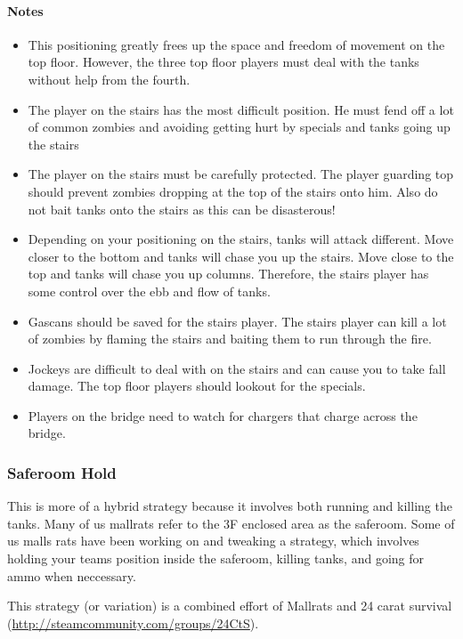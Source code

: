 \paragraph{Notes}
\begin{itemize}
\item This positioning greatly frees up the space and freedom of movement on the top floor. However, the three top floor players must deal with the tanks without help from the fourth.
\item The player on the stairs has the most difficult position. He must fend off a lot of common zombies and avoiding getting hurt by specials and tanks going up the stairs
\item The player on the stairs must be carefully protected. The player guarding top should prevent zombies dropping at the top of the stairs onto him. Also do not bait tanks onto the stairs as this can be disasterous!
\item Depending on your positioning on the stairs, tanks will attack different. Move closer to the bottom and tanks will chase you up the stairs. Move close to the top and tanks will chase you up columns. Therefore, the stairs player has some control over the ebb and flow of tanks.
\item Gascans should be saved for the stairs player. The stairs player can kill a lot of zombies by flaming the stairs and baiting them to run through the fire.
\item Jockeys are difficult to deal with on the stairs and can cause you to take fall damage. The top floor players should lookout for the specials.
\item Players on the bridge need to watch for chargers that charge across the bridge.
\end{itemize}

\subsubsection{Saferoom Hold}
This is more of a hybrid strategy because it involves both running and killing the tanks. Many of us mallrats refer to the 3F enclosed area as the saferoom. Some of us malls rats have been working on and tweaking a strategy, which involves holding your teams position inside the saferoom, killing tanks, and going for ammo when neccessary.

This strategy (or variation) is a combined effort of Mallrats and 24 carat survival
(\url{http://steamcommunity.com/groups/24CtS}).


